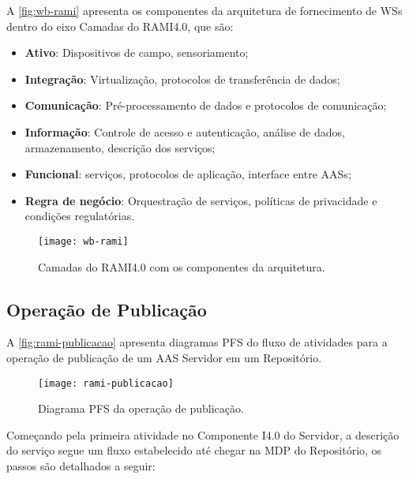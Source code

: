 	A \autoref{fig:wb-rami} apresenta os componentes da arquitetura de fornecimento de WSs dentro do eixo Camadas do RAMI4.0, que são:
	
	\begin{itemize}
		\item \textbf{Ativo}: Dispositivos de campo, sensoriamento; 
		\item \textbf{Integração}: Virtualização, protocolos de transferência de dados; 
		\item \textbf{Comunicação}: Pré-processamento de dados e protocolos de comunicação; 
		\item \textbf{Informação}: Controle de acesso e autenticação, análise de dados, armazenamento, descrição dos serviços;
		\item \textbf{Funcional}: serviços, protocolos de aplicação, interface entre AASs; 
		\item \textbf{Regra de negócio}: Orquestração de serviços, políticas de privacidade e condições regulatórias.
	\end{itemize}
	
	\begin{figure}[H]
		\centering
		\caption{Camadas do RAMI4.0 com os componentes da arquitetura.}
		\label{fig:wb-rami}
		\texttt{[image: wb-rami]}
	\end{figure}

\subsection{Operação de Publicação}

	A \autoref{fig:rami-publicacao} apresenta diagramas PFS do fluxo de atividades para a operação de publicação de um AAS Servidor em um Repositório.
	
	\begin{figure}[htb]
		\centering
		\caption{Diagrama PFS da operação de publicação.}
		\label{fig:rami-publicacao}
		\texttt{[image: rami-publicacao]}
	\end{figure}

	Começando pela primeira atividade no Componente I4.0 do Servidor, a descrição do serviço segue um fluxo estabelecido até chegar na MDP do Repositório, os passos são detalhados a seguir:
	
